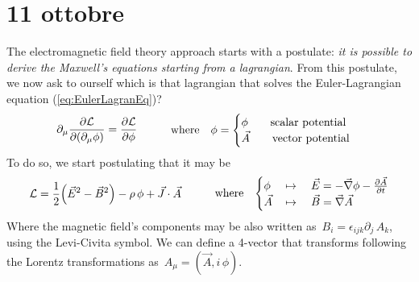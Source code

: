 \documentclass[class=article]{standalone}
\begin{document}
\section{11 ottobre}
The electromagnetic field theory approach starts with a postulate: \emph{it is possible to derive the Maxwell's equations starting from a lagrangian}.
From this postulate, we now ask to ourself which is that lagrangian that solves the Euler-Lagrangian equation (\ref{eq:EulerLagranEq})?
\begin{equation*}
\begin{split}
\partial_{\mu} \pdv{\mathcal{L}}{(\partial_{\mu} \phi)} = \pdv{\mathcal{L}}{\phi}
\end{split} 
\quad\quad\quad\mbox{where}\quad
\begin{split}
\phi = 
\begin{cases}
\phi \quad\quad \mbox{scalar potential} \\
\vec A \quad\quad \mbox{vector potential} 
\end{cases}
\end{split}
\label{eq:EulerLagranEq}
\end{equation*}
To do so, we start postulating that it may be
\begin{equation*}
\begin{split}
\mathcal{L} = \frac{1}{2} \Big( \vec E^2 - \vec B^2 \Big) - \rho \, \phi + \vec J \cdot \vec A
\end{split}
\quad\quad\quad\mbox{where}\quad
\begin{split}
\begin{cases}
\phi \, & \mapsto \quad \vec E = - \vec \nabla \phi - \pdv{\vec A}{t}  \\
\vec A \, & \mapsto \quad \vec B = \vec \nabla \vec A 
\end{cases}
\end{split}
\end{equation*}
Where the magnetic field's components may be also written as $\, B_i = \epsilon_{i j k} \partial_j \, A_k$, using the Levi-Civita symbol.
We can define a 4-vector that transforms following the Lorentz transformations as $\, A_{\mu} = (\vec A , i \, \phi) $.
\end{document}
